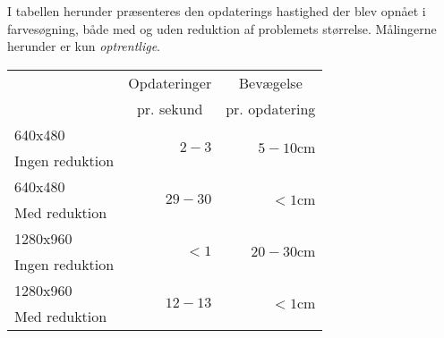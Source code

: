 I tabellen herunder præsenteres den opdaterings hastighed der blev opnået i farvesøgning, både med og uden reduktion af problemets størrelse.
Målingerne herunder er kun \emph{optrentlige}.

{
\newcommand{\mr}[1]{\multirow{2}{*}{#1}}
\newcommand{\ce}[1]{\multicolumn{1}{c|}{#1}}

\begin{center}
\begin{tabular}{| l | r | r |}
\hline
& \ce{Opdateringer} & \ce{Bevægelse}\\
& \ce{pr. sekund} & \ce{pr. opdatering}\\\hline
640x480&\mr{$2-3$}&\mr{$5-10$cm}\\
Ingen reduktion&&\\\hline
640x480&\mr{$29-30$}&\mr{$<1$cm}\\
Med reduktion&&\\\hline
1280x960&\mr{$<1$}&\mr{$20-30$cm}\\
Ingen reduktion&&\\\hline
1280x960&\mr{$12-13$}&\mr{$<1$cm}\\
Med reduktion&&\\\hline
\end{tabular}
\end{center}}
%
%
%
%
%
%
%